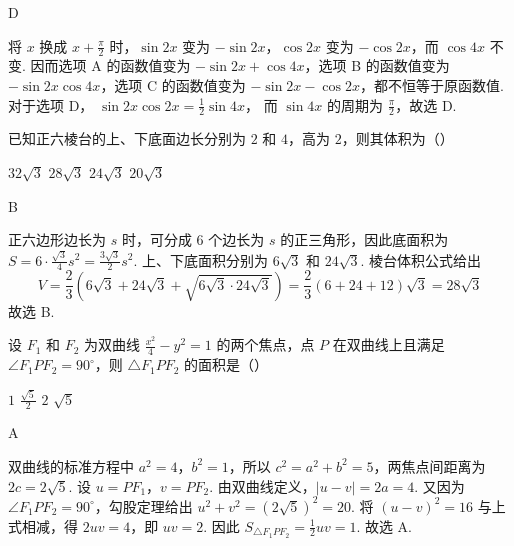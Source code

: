 \documentclass[UTF8,a4paper,oneside,11pt]{ctexbook}
\begin{document}
\begin{answer}
D
\end{answer}

\begin{solution}
将 \(x\) 换成 \(x+\frac{\pi}{2}\) 时，\(\sin 2x\) 变为 \(-\sin 2x\)，\(\cos 2x\) 变为 \(-\cos 2x\)，而 \(\cos 4x\) 不变. 因而选项 A 的函数值变为 \(-\sin 2x+\cos 4x\)，选项 B 的函数值变为 \(-\sin 2x\cos 4x\)，选项 C 的函数值变为 \(-\sin 2x-\cos 2x\)，都不恒等于原函数值. 对于选项 D，
\(\sin 2x\cos 2x=\frac12\sin 4x\)，
而 \(\sin 4x\) 的周期为 \(\frac{\pi}{2}\)，故选 D.
\end{solution}

\begin{problem}
已知正六棱台的上、下底面边长分别为 \(2\) 和 \(4\)，高为 \(2\)，则其体积为（\quad）

\choices
    {\(32\sqrt{3}\)}
    {\(28\sqrt{3}\)}
    {\(24\sqrt{3}\)}
    {\(20\sqrt{3}\)}
\end{problem}

\begin{answer}
B
\end{answer}

\begin{solution}
正六边形边长为 \(s\) 时，可分成 6 个边长为 \(s\) 的正三角形，因此底面积为 \(S=6\cdot\frac{\sqrt{3}}{4}s^2=\frac{3\sqrt{3}}{2}s^2\).
上、下底面积分别为 \(6\sqrt{3}\) 和 \(24\sqrt{3}\). 棱台体积公式给出
\[
V=\frac{2}{3}\left(6\sqrt{3}+24\sqrt{3}+\sqrt{6\sqrt{3}\cdot24\sqrt{3}}\right)
=\frac{2}{3}\left(6+24+12\right)\sqrt{3}=28\sqrt{3}
\]
故选 B.
\end{solution}

\begin{problem}
设 \(F_{1}\) 和 \(F_{2}\) 为双曲线 \(\frac{x^2}{4} - y^2 = 1\) 的两个焦点，点 \(P\) 在双曲线上且满足 \(\angle F_1PF_2 = 90^\circ\)，则 \(\triangle F_1PF_2\) 的面积是（\quad）

\choices
    {\(1\)}
    {\(\frac{\sqrt{5}}{2}\)}
    {\(2\)}
    {\(\sqrt{5}\)}
\end{problem}

\begin{answer}
A
\end{answer}

\begin{solution}
双曲线的标准方程中 \(a^2=4\)，\(b^2=1\)，所以 \(c^2=a^2+b^2=5\)，两焦点间距离为 \(2c=2\sqrt{5}\). 设
\(u=PF_1\)，\(v=PF_2\).
由双曲线定义，\(\lvert u-v\rvert=2a=4\). 又因为 \(\angle F_1PF_2=90^\circ\)，勾股定理给出 \(u^2+v^2=(2\sqrt{5})^2=20\). 将 \((u-v)^2=16\) 与上式相减，得 \(2uv=4\)，即 \(uv=2\). 因此 \(S_{\triangle F_1PF_2}=\frac12uv=1\).
故选 A.
\end{solution}
\end{document}
